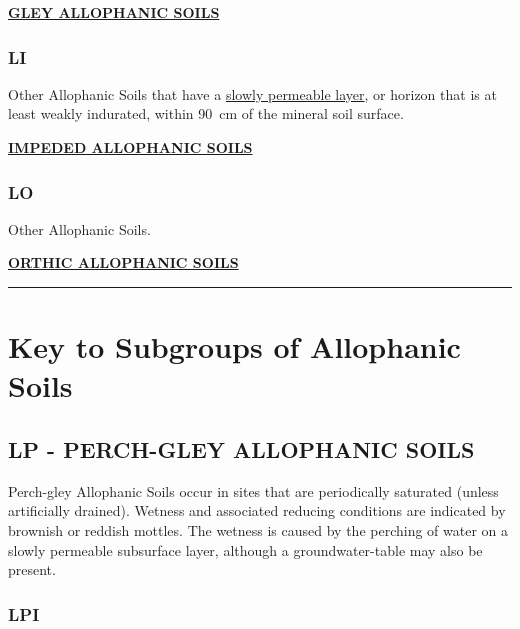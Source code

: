 \documentclass[
  letterpaper,
  DIV=11,
  numbers=noendperiod]{scrreprt}
\begin{document}
\protect\hyperlink{sec-LG}{\textbf{GLEY ALLOPHANIC SOILS}}

\hypertarget{sec-key-LI}{%
\subsubsection{\texorpdfstring{\textbf{LI}}{LI}}\label{sec-key-LI}}

Other Allophanic Soils that have a
\protect\hyperlink{sec-diag-slowp}{slowly permeable layer}, or horizon
that is at least weakly indurated, within 90~cm of the mineral soil
surface.

\protect\hyperlink{sec-LI}{\textbf{IMPEDED ALLOPHANIC SOILS}}

\hypertarget{sec-key-LO}{%
\subsubsection{\texorpdfstring{\textbf{LO}}{LO}}\label{sec-key-LO}}

Other Allophanic Soils.

\protect\hyperlink{sec-LO}{\textbf{ORTHIC ALLOPHANIC SOILS}}

\begin{center}\rule{0.5\linewidth}{0.5pt}\end{center}

\hypertarget{sec-sub-L}{%
\section{Key to Subgroups of Allophanic Soils}\label{sec-sub-L}}

\hypertarget{sec-LP}{%
\subsection{\texorpdfstring{\textbf{LP} - PERCH-GLEY ALLOPHANIC
SOILS}{LP - PERCH-GLEY ALLOPHANIC SOILS}}\label{sec-LP}}

Perch-gley Allophanic Soils occur in sites that are periodically
saturated (unless artificially drained). Wetness and associated reducing
conditions are indicated by brownish or reddish mottles. The wetness is
caused by the perching of water on a slowly permeable subsurface layer,
although a groundwater-table may also be present.

\hypertarget{sec-key-LPI}{%
\subsubsection{\texorpdfstring{\textbf{LPI}}{LPI}}\label{sec-key-LPI}}
\end{document}
